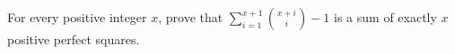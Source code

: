 For every positive integer $x$, prove that $\displaystyle\sum_{i=1}^{x+1}\binom{x+i}{i}-1$ is a sum of exactly $x$ positive perfect squares.
